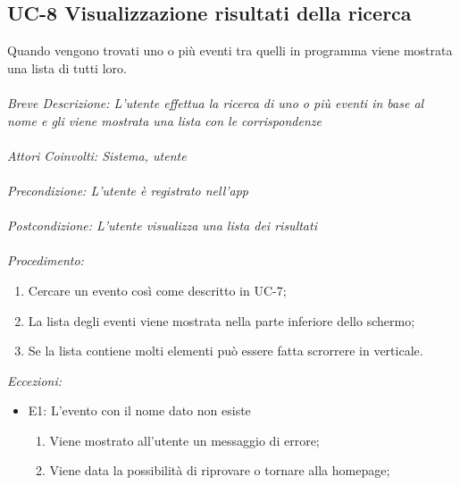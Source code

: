 \subsection{UC-8 Visualizzazione risultati della ricerca}
Quando vengono trovati uno o più eventi tra quelli in programma viene mostrata una lista di tutti loro.
\\
\\
\textit{Breve Descrizione: L'utente effettua la ricerca di uno o più eventi in base al nome e gli viene mostrata una lista con le corrispondenze} 
\\
\\
\textit{Attori Coinvolti: Sistema, utente}
\\
\\
\textit{Precondizione: L'utente è registrato nell'app}
\\
\\
\textit{Postcondizione: L'utente visualizza una lista dei risultati}
\\
\\
\textit{Procedimento:}
\begin{enumerate}
	\item Cercare un evento così come descritto in UC-7;
	\item La lista degli eventi viene mostrata nella parte inferiore dello schermo;
	\item Se la lista contiene molti elementi può essere fatta scrorrere in verticale.
\end{enumerate}


\textit{Eccezioni:}
\begin{itemize}
	\item E1: L'evento con il nome dato non esiste
	\begin{enumerate}
		\item Viene mostrato all'utente un messaggio di errore;
		\item Viene data la possibilità di riprovare o tornare alla homepage;
	\end{enumerate}
\end{itemize}